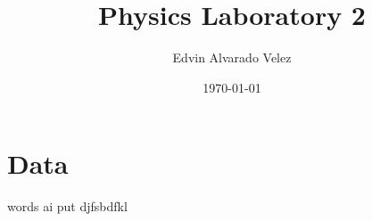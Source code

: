 \documentclass[a4paper,12pt]{article}
\title{Physics Laboratory 2}
\author{Edvin Alvarado Velez}
\date{\today}
\begin{document}
\maketitle
\tableofcontents

\section*{Data}
words ai put djfsbdfkl
\end{document}
